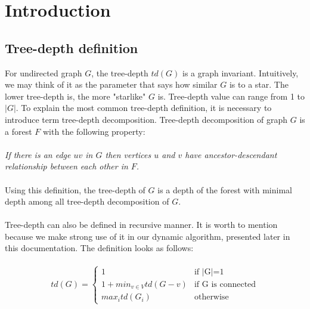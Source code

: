 \section{Introduction}
\subsection{Tree-depth definition}
For undirected graph $G$, the tree-depth $td(G)$ is a graph invariant. Intuitively, we may think of it as the parameter that says how similar $G$ is to a star. The lower tree-depth is, the more "starlike" $G$ is.
Tree-depth value can range from 1 to $|G|$.
To explain the most common tree-depth definition, it is necessary to introduce term tree-depth decomposition. Tree-depth decomposition of graph $G$ is a forest $F$ with the following property:\\\\
\emph{If there is an edge $uv$ in $G$ then vertices $u$ and $v$ have ancestor-descendant relationship between each other in $F$.}\\\\
Using this definition, the tree-depth of $G$ is a depth of the forest with minimal depth among all tree-depth decomposition of $G$.\\\\
Tree-depth can also be defined in recursive manner. It is worth to mention because we make strong use of it in our dynamic algorithm, presented later in this documentation. The definition looks as follows:\\\\
\begin{equation}
td(G) =
\begin{cases}
1 & \text{if $|$G$|$=1}\\
1+min_{v \in V} td(G-v) & \text{if G is connected}\\
max_{i} td(G_{i})  & \text{otherwise}
\end{cases}\label{td_def}
\end{equation}
\\\\
